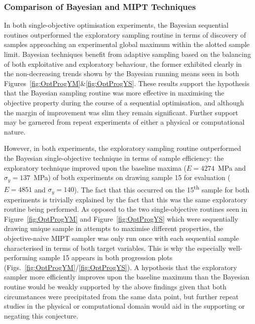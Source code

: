 \subsubsection{Comparison of Bayesian and MIPT Techniques}
In both single-objective optimisation experiments, the Bayesian sequential
 routines outperformed the exploratory sampling routine in terms of
 discovery of samples approaching an experimental global maximum within the 
 alotted sample limit.
Bayesian techniques benefit from adaptive sampling based on the
 balancing of both exploitative and exploratory behaviour, the former 
 exhibited clearly in the non-decreasing trends shown by the Bayesian 
 running means seen in both Figures~\ref{fig:OptProgYM}\&\ref{fig:OptProgYS}.
These results support the hypothesis that the Bayesian sampling
 routine was more effective in maximising the objective property during the
 course of a sequential optimisation, and although the margin of improvement
 was slim they remain significant.
Further support may be garnered from repeat experiments of either a physical 
 or computational nature.

However, in both experiments, the exploratory sampling routine 
 outperformed the Bayesian single-objective technique in terms of sample 
 efficiency: the exploratory technique improved upon the baseline maxima 
 (\(E=4274\)~\unit{\mega\pascal} and \(\sigma_{y}=137\)~\unit{\mega\pascal}) 
 of both experiments on drawing sample 15 for evaluation (\(E=4851\) and
 \(\sigma_{y}=140\)).
The fact that this occurred on the 15\textsuperscript{th} sample for both
 experiments is trivially explained by the fact that this was the same 
 exploratory routine being performed.
As opposed to the two single-objective routines seen in Figure~\ref{fig:OptProgYM}
 and Figure~\ref{fig:OptProgYS} which were sequentially drawing unique sample in attempts
 to maximise different properties, the objective-naive MIPT sampler was 
 only run once with each sequential sample characterised in terms of both
 target variables.
This is why the especially well-performing sample 15 appears in both 
 progression plots (Figs.~\ref{fig:OptProgYM}/\ref{fig:OptProgYS}).
A hypothesis that the exploratory sampler more efficiently improves upon
 the baseline maximum than the Bayesian routine would be weakly supported
 by the above findings given that both circumstances were precipitated from
 the same data point, but further repeat studies in the physical or
 computational domain would aid in the supporting or negating this
 conjecture.

